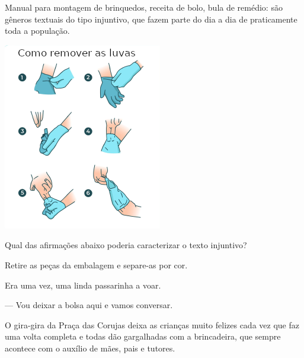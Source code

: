 \begin{myquote}
Manual para montagem de brinquedos, receita de bolo, bula de remédio:
são gêneros textuais do tipo injuntivo, que fazem parte do dia a dia de
praticamente toda a população.

\begin{center}
\includegraphics[width=.8\textwidth]{./media/image23m.png}
\end{center}

\end{myquote}

Qual das afirmações abaixo poderia caracterizar o texto injuntivo?

\begin{escolha}
\item Retire as peças da embalagem e separe-as por cor.

\item Era uma vez, uma linda passarinha a voar.

\item --- Vou deixar a bolsa aqui e vamos conversar.

\item O gira-gira da Praça das Corujas deixa as crianças muito felizes cada vez que faz uma volta completa e todas dão gargalhadas com a brincadeira, que sempre acontece com o auxílio de mães, pais e tutores. 
\end{escolha}


